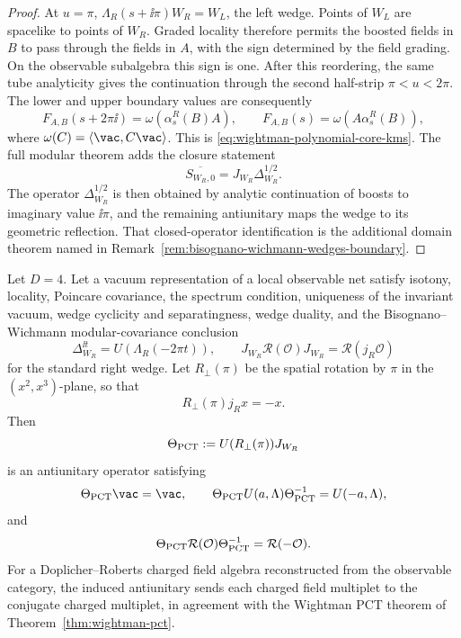 \begin{proof}
At \(u=\pi\), \(\Lambda_R(s+\ii\pi)W_R=W_L\), the left wedge.  Points of
\(W_L\) are spacelike to points of \(W_R\).  Graded locality therefore permits
the boosted fields in \(B\) to pass through the fields in \(A\), with the sign
determined by the field grading.  On the observable subalgebra this sign is
one.  After this reordering, the same tube analyticity gives the continuation
through the second half-strip \(\pi<u<2\pi\).  The lower and upper boundary
values are consequently
\begin{equation}
  F_{A,B}(s+2\pi\ii)
  =
  \omega\!\left(\alpha_s^R(B)A\right),
  \qquad
  F_{A,B}(s)=\omega\!\left(A\alpha_s^R(B)\right),
  \label{eq:bw-wightman-kms-boundary}
\end{equation}
where \(\omega(C)=\langle\vac,C\vac\rangle\).  This is
\eqref{eq:wightman-polynomial-core-kms}.  The full modular theorem adds the
closure statement
\[
  \overline{S_{W_R,0}}=J_{W_R}\Delta_{W_R}^{1/2}.
\]
The operator \(\Delta_{W_R}^{1/2}\) is then obtained by analytic continuation
of boosts to imaginary value \(\ii\pi\), and the remaining antiunitary maps the
wedge to its geometric reflection.  That closed-operator identification is the
additional domain theorem named in
Remark~\ref{rem:bisognano-wichmann-wedges-boundary}.
\end{proof}

\begin{corollary}
\label{cor:aqft-pct-from-modular-covariance}
Let \(D=4\).  Let a vacuum representation of a local observable net satisfy
isotony, locality, Poincare covariance, the spectrum condition, uniqueness of
the invariant vacuum, wedge cyclicity and separatingness, wedge duality, and
the Bisognano--Wichmann modular-covariance conclusion
\[
  \Delta_{W_R}^{\ii t}=U(\Lambda_R(-2\pi t)),
  \qquad
  J_{W_R}\mathcal R(\mathcal O)J_{W_R}=\mathcal R(j_R\mathcal O)
\]
for the standard right wedge.  Let \(R_\perp(\pi)\) be the spatial rotation by
\(\pi\) in the \((x^2,x^3)\)-plane, so that
\[
  R_\perp(\pi)j_R x=-x .
\]
Then
\begin{equation}
  \Theta_{\rm PCT}:=U(R_\perp(\pi))J_{W_R}
  \label{eq:aqft-pct-modular-conjugation}
\end{equation}
is an antiunitary operator satisfying
\[
  \Theta_{\rm PCT}\vac=\vac,
  \qquad
  \Theta_{\rm PCT}U(a,\Lambda)\Theta_{\rm PCT}^{-1}=U(-a,\Lambda),
\]
and
\begin{equation}
  \Theta_{\rm PCT}\mathcal R(\mathcal O)\Theta_{\rm PCT}^{-1}
  =
  \mathcal R(-\mathcal O).
  \label{eq:aqft-pct-net-action}
\end{equation}
For a Doplicher--Roberts charged field algebra reconstructed from the
observable category, the induced antiunitary sends each charged field
multiplet to the conjugate charged multiplet, in agreement with the Wightman
PCT theorem of Theorem~\ref{thm:wightman-pct}.
\end{corollary}

